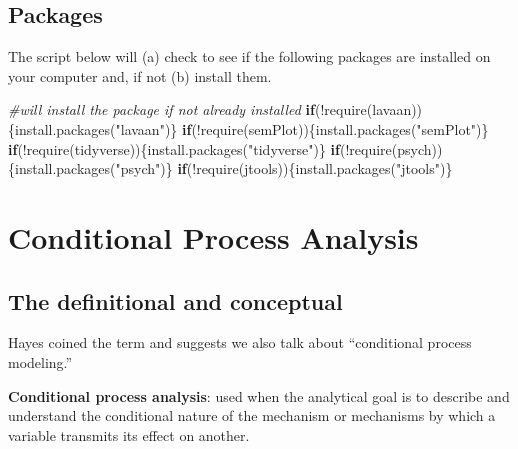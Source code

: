 \documentclass[
  11pt,
]{book}
\newenvironment{Shaded}{\begin{snugshade}}{\end{snugshade}}
\newcommand{\CommentTok}[1]{\textcolor[rgb]{0.56,0.35,0.01}{\textit{#1}}}
\newcommand{\ControlFlowTok}[1]{\textcolor[rgb]{0.13,0.29,0.53}{\textbf{#1}}}
\newcommand{\FunctionTok}[1]{\textcolor[rgb]{0.00,0.00,0.00}{#1}}
\newcommand{\NormalTok}[1]{#1}
\newcommand{\SpecialCharTok}[1]{\textcolor[rgb]{0.00,0.00,0.00}{#1}}
\newcommand{\StringTok}[1]{\textcolor[rgb]{0.31,0.60,0.02}{#1}}
\begin{document}
\hypertarget{packages-8}{%
\subsection{Packages}\label{packages-8}}

The script below will (a) check to see if the following packages are installed on your computer and, if not (b) install them.

\begin{Shaded}
\begin{Highlighting}[]
\CommentTok{\#will install the package if not already installed}
\ControlFlowTok{if}\NormalTok{(}\SpecialCharTok{!}\FunctionTok{require}\NormalTok{(lavaan))\{}\FunctionTok{install.packages}\NormalTok{(}\StringTok{"lavaan"}\NormalTok{)\}}
\ControlFlowTok{if}\NormalTok{(}\SpecialCharTok{!}\FunctionTok{require}\NormalTok{(semPlot))\{}\FunctionTok{install.packages}\NormalTok{(}\StringTok{"semPlot"}\NormalTok{)\}}
\ControlFlowTok{if}\NormalTok{(}\SpecialCharTok{!}\FunctionTok{require}\NormalTok{(tidyverse))\{}\FunctionTok{install.packages}\NormalTok{(}\StringTok{"tidyverse"}\NormalTok{)\}}
\ControlFlowTok{if}\NormalTok{(}\SpecialCharTok{!}\FunctionTok{require}\NormalTok{(psych))\{}\FunctionTok{install.packages}\NormalTok{(}\StringTok{"psych"}\NormalTok{)\}}
\ControlFlowTok{if}\NormalTok{(}\SpecialCharTok{!}\FunctionTok{require}\NormalTok{(jtools))\{}\FunctionTok{install.packages}\NormalTok{(}\StringTok{"jtools"}\NormalTok{)\}}
\end{Highlighting}
\end{Shaded}

\hypertarget{conditional-process-analysis}{%
\section{Conditional Process Analysis}\label{conditional-process-analysis}}

\hypertarget{the-definitional-and-conceptual-1}{%
\subsection{The definitional and conceptual}\label{the-definitional-and-conceptual-1}}

Hayes \citeyearpar{hayes_introduction_2018} coined the term and suggests we also talk about ``conditional process modeling.''

\textbf{Conditional process analysis}: used when the analytical goal is to describe and understand the conditional nature of the mechanism or mechanisms by which a variable transmits its effect on another.
\end{document}
